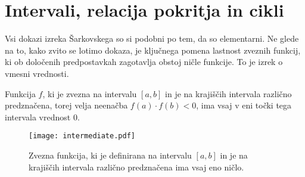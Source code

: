 \documentclass[../TG_magistrsko_delo_sections.tex]{subfiles}
\begin{document}
\section{Intervali, relacija pokritja in cikli}\label{sec:intervali}%
Vsi dokazi izreka Šarkovskega so si podobni po tem, da so elementarni. Ne glede na to, kako zvito se lotimo dokaza, je ključnega pomena lastnost zveznih funkcij, ki ob določenih predpostavkah zagotavlja obstoj ničle funkcije. To je izrek o vmesni vrednosti.

\begin{izrek}\label{izr:iovv}
Funkcija $f$, ki je zvezna na intervalu $[a, b]$ in je na krajiščih intervala različno predznačena, torej velja neenačba $f(a)\cdot f(b) < 0$, ima vsaj v eni točki tega intervala vrednost 0.
\end{izrek}

\begin{figure}[h]
  \centering
  \texttt{[image: intermediate.pdf]}
  \caption[Primer vektorske slike.]{Zvezna funkcija, ki je definirana na intervalu $[a,b]$ in je na krajiščih intervala različno predznačena ima vsaj eno ničlo.}
  \label{fig:bezje}
\end{figure}
\end{document}
